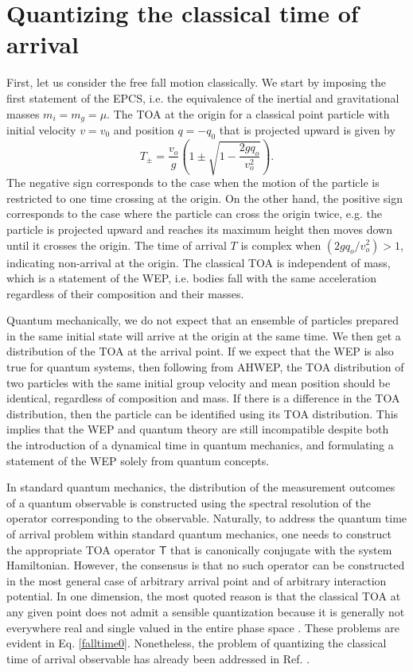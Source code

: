 \documentclass[%
 reprint,
 amsmath,amssymb,
 aps,
]{revtex4-1}
\newcommand{\opr}[1]{\ensuremath{\mathbf{\mathsf{#1}}}}
\begin{document}
\section{Quantizing the classical time of arrival}
\label{sec:quantization}

First, let us consider the free fall motion classically. We start by imposing the first statement of the EPCS, i.e. the equivalence of the inertial and gravitational masses $m_i=m_g=\mu$. The TOA at the origin for a classical point particle with initial velocity $v=v_0$ and position $q=-q_0$ that is projected upward is given by
\begin{equation}
T_{\pm}=\frac{v_o}{g} \left( 1 \pm \sqrt{1 -  \frac{2g q_o}{v_o^2}} \right).
\label{falltime0}
\end{equation}
The negative sign corresponds to the case when the motion of the particle is restricted to one time crossing at the origin. On the other hand, the positive sign corresponds to the case where the particle can cross the origin twice, e.g. the particle is projected upward and reaches its maximum height then moves down until it crosses the origin.  The time of arrival $T$ is complex when $(2 g  q_o/v_o^2)>1$, indicating non-arrival at the origin. The classical TOA is independent of mass, which is a statement of the WEP, i.e. bodies fall with the same acceleration regardless of their composition and their masses.

Quantum mechanically, we do not expect that an ensemble of particles prepared in the same initial state will arrive at the origin at the same time. We then get a distribution of the TOA at the arrival point. If we expect that the WEP is also true for quantum systems, then following from AHWEP, the TOA distribution of two particles with the same initial group velocity and mean position should be identical, regardless of composition and mass. If there is a difference in the TOA distribution, then the particle can be identified using its TOA distribution. This implies that the WEP and quantum theory are still incompatible despite both the introduction of a dynamical time in quantum mechanics, and formulating a statement of the WEP solely from quantum concepts.

In standard quantum mechanics, the distribution of the measurement outcomes of a quantum observable is constructed using the spectral resolution of the operator corresponding to the observable. Naturally, to address the quantum time of arrival problem within standard quantum mechanics, one needs to construct the appropriate TOA operator $\opr{T}$ that is canonically conjugate with the system Hamiltonian. However, the consensus is that no such operator can be constructed in the most general case of arbitrary arrival point and of arbitrary interaction potential. In one dimension, the most quoted reason is that the classical TOA at any given point does not admit a sensible quantization because it is generally not everywhere real and single valued in the entire phase space \cite{jaykel,reason1,reason2}. These problems are evident in Eq. \eqref{falltime0}. Nonetheless, the problem of quantizing the classical time of arrival observable has already been addressed in Ref. \cite{jaykel}.
\end{document}

